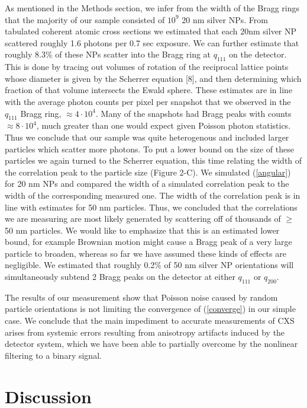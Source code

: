 \documentclass [11pt,fleqn]{article}
\begin{document}
As mentioned in the Methods section, we infer from the width of the Bragg rings that the majority of our sample consisted of $10^9$ 20 nm silver NPs. From tabulated coherent atomic cross sections \cite{Henke:1993wx} we estimated that each 20nm silver NP scattered roughly 1.6 photons per 0.7 sec exposure. We can further estimate that roughly 8.3\% of these NPs scatter into the Bragg ring at $q_{111}$ on the detector. This is done by tracing out volumes of rotation of the reciprocal lattice points whose diameter is given by the Scherrer equation [8], and then determining which fraction of that volume intersects the Ewald sphere. These estimates are in line with the average photon counts per pixel per snapshot that we observed in the $q_{111}$ Bragg ring, $\approx 4 \cdot10^4$. Many of the snapshots had Bragg peaks with counts $\approx 8 \cdot10^4$, much greater than one would expect given Poisson photon statistics. Thus we conclude that our sample was quite heterogenous and included larger particles which scatter more photons. To put a lower bound on the size of these particles we again turned to the Scherrer equation, this time relating the width of the correlation peak to the particle size (Figure 2-C). We simulated (\ref{angular}) for 20 nm NPs and compared the width of a simulated correlation peak to the width of the corresponding measured one. The width of the correlation peak is in line with estimates for 50 nm particles. Thus, we concluded that the correlations we are measuring are most likely generated by scattering off of thousands of $\ge$50 nm particles. We would like to emphasize that this is an estimated lower bound, for example Brownian motion might cause a Bragg peak of a very large particle to broaden, whereas so far we have assumed these kinds of effects are negligible. We estimated that roughly 0.2\% of 50 nm silver NP orientations will simultaneously subtend 2 Bragg peaks on the detector at either $q_{111}$ or $q_{200}$.

The results of our measurement show that Poisson noise caused by random particle orientations is not limiting the convergence of (\ref{converge}) in our simple case. We conclude that the main impediment to accurate measurements of CXS arises from systemic errors resulting from anisotropy artifacts induced by the detector system, which we have been able to partially overcome by the nonlinear filtering to a binary signal.

\section{Discussion}
\end{document}
